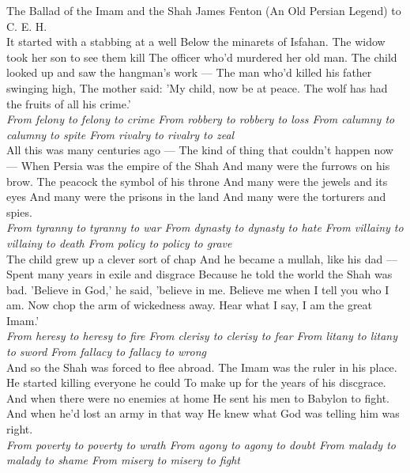 \begin{poem}
{The Ballad of the Imam and the Shah}
{James Fenton}
(An Old Persian Legend)
to C. E. H.\\

 It started with a stabbing at a well
 Below the minarets of Isfahan.
 The widow took her son to see them kill
 The officer who'd murdered her old man.
 The child looked up and saw the hangman's work ---
 The man who'd killed his father swinging high,
 The mother said: 'My child, now be at peace.
 The wolf has had the fruits of all his crime.'\\

\textit{
  From felony to felony to crime
  From robbery to robbery to loss
  From calumny to calumny to spite
  From rivalry to rivalry to zeal}\\

 All this was many centuries ago ---
 The kind of thing that couldn't happen now ---
 When Persia was the empire of the Shah
 And many were the furrows on his brow.
 The peacock the symbol of his throne
 And many were the jewels and its eyes
 And many were the prisons in the land
 And many were the torturers and spies.\\

\textit{
  From tyranny to tyranny to war
  From dynasty to dynasty to hate
  From villainy to villainy to death
  From policy to policy to grave}\\

 The child grew up a clever sort of chap
 And he became a mullah, like his dad ---
 Spent many years in exile and disgrace
 Because he told the world the Shah was bad.
 'Believe in God,' he said, 'believe in me.
 Believe me when I tell you who I am.
 Now chop the arm of wickedness away.
 Hear what I say, I am the great Imam.'\\

\textit{
  From heresy to heresy to fire
  From clerisy to clerisy to fear
  From litany to litany to sword
  From fallacy to fallacy to wrong}\\

 And so the Shah was forced to flee abroad.
 The Imam was the ruler in his place.
 He started killing everyone he could
 To make up for the years of his discgrace.
 And when there were no enemies at home
 He sent his men to Babylon to fight.
 And when he'd lost an army in that way
 He knew what God was telling him was right.\\

\textit{
  From poverty to poverty to wrath
  From agony to agony to doubt
  From malady to malady to shame
  From misery to misery to fight}\\


\end{poem}
